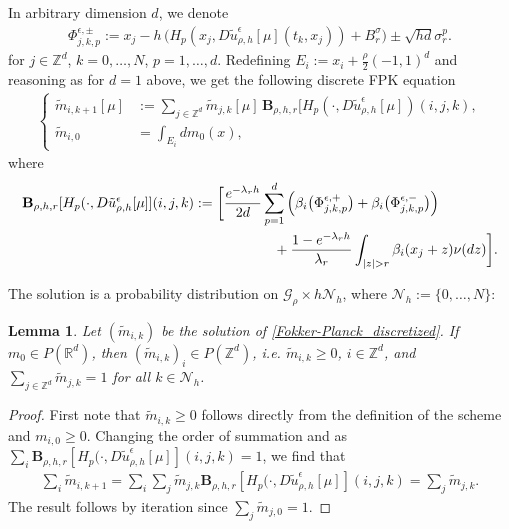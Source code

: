 \documentclass[a4paper,  twoside, 10pt, leqno]{amsart}
\newcommand{\Z}{\mathbb{Z}}
\newcommand{\zd}{\mathbb{Z}^d}
\newcommand{\rd}{\mathbb{R}^d}
\newtheorem{lemma}[thm]{Lemma}
\theoremstyle{remark}
\theoremstyle{definition}
\begin{document}
In arbitrary dimension $d$, we
denote
 \begin{align}\label{defn_characteristics}
    \Phi^{\epsilon, \pm}_{j,k,p} := x_j - h\,\big( 
  H_{p} ( x_j, D\tilde u_{\rho,h}^{\epsilon}[\mu] (t_k,x_j) )    + B_r^{\sigma} \big)
 \pm \sqrt{hd} \sigma_r^p . %
\end{align} 
for $j \in \zd$, $k=0,\ldots, N$, $p=1, \ldots,d$. Redefining $E_i := x_i + \frac{\rho}{2} (-1,1)^d$ and reasoning as for 
$d=1$ above, we get the following discrete FPK equation
\begin{align} \label{Fokker-Planck_discretized}
\begin{cases}
    \tilde m_{i,k+1} [ \mu ] & := \displaystyle \sum_{j\in \zd} \tilde m_{j,k}[\mu] \, \mathbf{B}_{\rho,h,r} [ H_{p} ( \cdot, D\tilde u_{\rho,h}^{\epsilon} [\mu]  ) ( i,j,k ), \\ 
    \tilde m_{i,0} & = \displaystyle \int_{E_i} dm_0(x),
\end{cases}
\end{align}
where 
\begin{align}
\begin{split}
     \mathbf{B}_{\rho,h,r} [ H_{p} ( \cdot, D\tilde u_{\rho,h}^{\epsilon} [\mu] ] ( i,j,k ) & := \bigg[  
        \frac{e^{-\lambda_r h} }{2d} \sum_{p=1}^d \Big(\beta_i \big( \Phi^{\epsilon, +}_{j,k,p} \big) 
        + \beta_i\big( \Phi^{\epsilon, -}_{j,k,p} \big) \Big) \\
     & \hspace*{2cm} +  \frac{1-e^{-\lambda_r
          h}}{\lambda_r} \int_{|z| > r} \beta_i (x_j+z) \nu (dz)
      \bigg].
      \end{split}
    \label{fokker-planck-general-discretized}
\end{align}

The solution is a probability
distribution on $\mathcal G_\rho \times h \mathcal  N_h$, where
$\mathcal{N}_h:=\{0,\dots,N\}$:  
\begin{lemma} \label{mass_conservation}
Let $(\tilde m_{i,k})$ be the solution of
\eqref{Fokker-Planck_discretized}. If $m_0\in P(\rd)$, then
$(\tilde m_{i,k})_i\in P(\Z^d)$, i.e. $\tilde m_{i,k}\geq 0$,  $i\in\Z^d$, and
$\sum_{j\in\Z^d} \tilde m_{j,k} =1$ for all $k\in\mathcal{N}_h$. 
    
\end{lemma}
\begin{proof}
First note that $\tilde m_{i,k}\geq 0$ follows directly from the definition
of the scheme and $m_{i,0}\geq 0$. Changing the order of summation and
as $\sum_i \mathbf{B}_{\rho,h,r} [ H_{p} ( \cdot, D\tilde u_{\rho,h}^{\epsilon} [\mu]] ( i,j,k ) =1$, we find that 
\begin{align*}
  \sum_i \tilde m_{i,k+1} = \sum_{i} \sum_{j} \tilde m_{j,k}  \mathbf{B}_{\rho,h,r} [ H_{p} ( \cdot, D\tilde u_{\rho,h}^{\epsilon} [\mu] ] ( i,j,k ) = \sum_{j} \tilde m_{j,k}.
\end{align*} 
The result follows by iteration since $\sum_{j}\tilde m_{j,0}=1$.
\end{proof}
\end{document}
